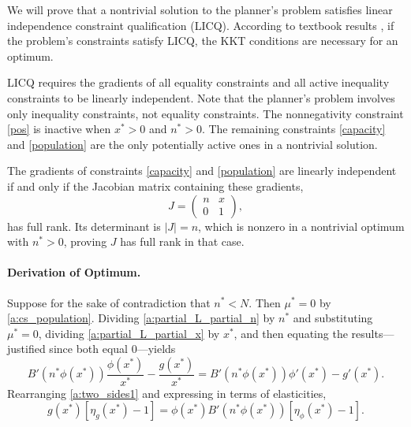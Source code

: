 \documentclass[12pt]{article}
\newcommand{\efficacy}{\phi}
\newcommand{\general}{g}
\newcommand{\benefit}{B}
\newcommand{\elasticity}[1]{\eta_{#1}}
\begin{document}
We will prove that a nontrivial solution to the planner's problem
satisfies linear independence constraint qualification (LICQ).
According to textbook results \citep[see, e.g.,][]{Solodov2011}, if
the problem's constraints satisfy LICQ, the KKT conditions are
necessary for an optimum.

LICQ requires the gradients of all equality constraints and all active
inequality constraints to be linearly independent. Note that the
planner's problem involves only inequality constraints, not equality
constraints. The nonnegativity constraint \eqref{pos} is inactive when
$x^* > 0$ and $n^* > 0$. The remaining constraints \eqref{capacity}
and \eqref{population} are the only potentially active ones in a
nontrivial solution.

The gradients of constraints \eqref{capacity} and \eqref{population}
are linearly independent if and only if the Jacobian matrix containing
these gradients,
\begin{equation}
\label{a:Jacobian}
J = \begin{pmatrix}
n & x \\
0 & 1
\end{pmatrix},
\end{equation}
has full rank. Its determinant is $|J| = n$, which is nonzero in a
nontrivial optimum with $n^* > 0$, proving $J$ has full rank in that
case.

\paragraph{Derivation of Optimum.}

Suppose for the sake of contradiction that $n^* < N$. Then $\mu^* = 0$
by \eqref{a:cs_population}. Dividing \eqref{a:partial_L_partial_n} by
$n^*$ and substituting $\mu^* = 0$, dividing
\eqref{a:partial_L_partial_x} by $x^*$, and then equating the
results---justified since both equal 0---yields
\begin{equation}
\label{a:two_sides1}
\benefit'(n^* \efficacy(x^*)) \frac{\efficacy(x^*)}{x^*} - \frac{\general(x^*)}{x^*} = \benefit'(n^* \efficacy(x^*)) \efficacy'(x^*) - \general'(x^*).
\end{equation}
Rearranging \eqref{a:two_sides1} and expressing in terms of elasticities,
\begin{equation}
\label{a:two_sides2}
\general(x^*) \left[ \elasticity{\general}(x^*) - 1 \right] = \efficacy(x^*) \benefit'(n^* \efficacy(x^*)) \left[
  \elasticity{\efficacy}(x^*) - 1 \right].
\end{equation}
\end{document}
